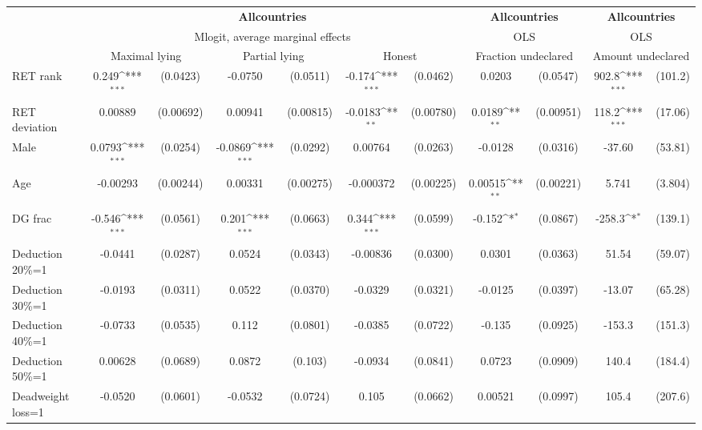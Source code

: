 \def\sym#1{\ifmmode^{#1}\else\(^{#1}\)\fi}
\begin{tabular}{l|cccccc|cc|cc}
\hline\hline
&\multicolumn{6}{c|}{\bf All\space{}countries}&\multicolumn{2}{c|}{\bf All\space{}countries}&\multicolumn{2}{c}{\bf All\space{}countries}\\ &\multicolumn{6}{c|}{Mlogit, average marginal effects }&\multicolumn{2}{c|}{OLS}&\multicolumn{2}{c}{OLS}\\
                &\multicolumn{2}{c}{Maximal lying}&\multicolumn{2}{c}{Partial lying}&\multicolumn{2}{c}{Honest}  &\multicolumn{2}{c}{Fraction undeclared}&\multicolumn{2}{c}{Amount undeclared}\\
\hline
RET rank        &    0.249\sym{***}& (0.0423)&  -0.0750         & (0.0511)&   -0.174\sym{***}& (0.0462)&   0.0203         & (0.0547)&    902.8\sym{***}&  (101.2)\\
RET deviation   &  0.00889         &(0.00692)&  0.00941         &(0.00815)&  -0.0183\sym{**} &(0.00780)&   0.0189\sym{**} &(0.00951)&    118.2\sym{***}&  (17.06)\\
Male            &   0.0793\sym{***}& (0.0254)&  -0.0869\sym{***}& (0.0292)&  0.00764         & (0.0263)&  -0.0128         & (0.0316)&   -37.60         &  (53.81)\\
Age             & -0.00293         &(0.00244)&  0.00331         &(0.00275)&-0.000372         &(0.00225)&  0.00515\sym{**} &(0.00221)&    5.741         &  (3.804)\\
DG frac         &   -0.546\sym{***}& (0.0561)&    0.201\sym{***}& (0.0663)&    0.344\sym{***}& (0.0599)&   -0.152\sym{*}  & (0.0867)&   -258.3\sym{*}  &  (139.1)\\
Deduction 20\%=1&  -0.0441         & (0.0287)&   0.0524         & (0.0343)& -0.00836         & (0.0300)&   0.0301         & (0.0363)&    51.54         &  (59.07)\\
Deduction 30\%=1&  -0.0193         & (0.0311)&   0.0522         & (0.0370)&  -0.0329         & (0.0321)&  -0.0125         & (0.0397)&   -13.07         &  (65.28)\\
Deduction 40\%=1&  -0.0733         & (0.0535)&    0.112         & (0.0801)&  -0.0385         & (0.0722)&   -0.135         & (0.0925)&   -153.3         &  (151.3)\\
Deduction 50\%=1&  0.00628         & (0.0689)&   0.0872         &  (0.103)&  -0.0934         & (0.0841)&   0.0723         & (0.0909)&    140.4         &  (184.4)\\
Deadweight loss=1&  -0.0520         & (0.0601)&  -0.0532         & (0.0724)&    0.105         & (0.0662)&  0.00521         & (0.0997)&    105.4         &  (207.6)\\

\end{tabular}
